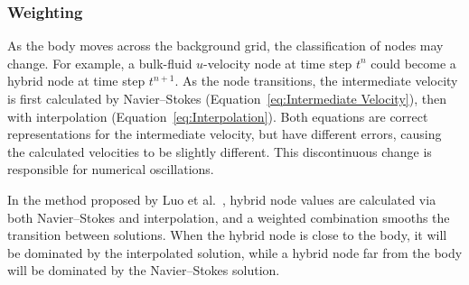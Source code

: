 \documentclass[preprint,12pt]{elsarticle}
\begin{document}
\subsubsection{Weighting}
%
As the body moves across the background grid, the classification of nodes may change.
For example, a bulk-fluid $u$-velocity node at time step $t^n$ could become a hybrid node at time step $t^{n+1}$.
As the node transitions, the intermediate velocity is first calculated by Navier--Stokes (Equation~\eqref{eq:Intermediate Velocity}), then with interpolation (Equation~\eqref{eq:Interpolation}).
Both equations are correct representations for the intermediate velocity, but have different errors, causing the calculated velocities to be slightly different.
This discontinuous change is responsible for numerical oscillations.

In the method proposed by Luo et al.~\cite{Luo:2012gx}, hybrid node values are calculated via both Navier--Stokes and interpolation, and a weighted combination smooths the transition between solutions.
When the hybrid node is close to the body, it will be dominated by the interpolated solution, while a hybrid node far from the body will be dominated by the Navier--Stokes solution.
\end{document}

